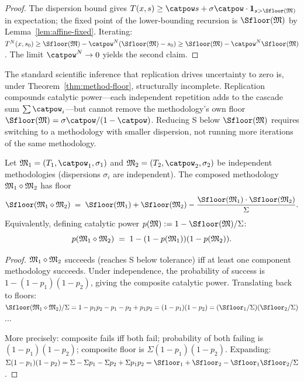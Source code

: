 \begin{proof}
The dispersion bound gives $T(x,s) \geq \catpow s + \sigma\catpow \cdot \mathbf{1}_{s > \Sfloor(\Meth)}$ in expectation; the fixed point of the lower-bounding recursion is $\Sfloor(\Meth)$ by Lemma~\ref{lem:affine-fixed}. Iterating: $T^N(x, s_0) \geq \Sfloor(\Meth) - \catpow^N(\Sfloor(\Meth) - s_0) \geq \Sfloor(\Meth) - \catpow^N \Sfloor(\Meth)$. The limit $\catpow^N \to 0$ yields the second claim.
\end{proof}

\begin{remark}\label{rem:replication}
The standard scientific inference that replication drives uncertainty to zero is, under Theorem~\ref{thm:method-floor}, structurally incomplete. Replication compounds catalytic power---each independent repetition adds to the cascade sum $\sum \catpow_i$---but cannot remove the methodology's own floor $\Sfloor(\Meth) = \sigma\catpow/(1-\catpow)$. Reducing S below $\Sfloor(\Meth)$ requires switching to a methodology with smaller dispersion, not running more iterations of the same methodology.
\end{remark}

\begin{theorem}\label{thm:catcomp}
Let $\Meth_1 = (T_1, \catpow_1, \sigma_1)$ and $\Meth_2 = (T_2, \catpow_2, \sigma_2)$ be independent methodologies (dispersions $\sigma_i$ are independent). The composed methodology $\mathfrak{M}_1 \diamond \mathfrak{M}_2$ has floor
\[
\Sfloor(\Meth_1 \diamond \Meth_2)
\;=\; \Sfloor(\Meth_1) + \Sfloor(\Meth_2)
    - \frac{\Sfloor(\Meth_1) \cdot \Sfloor(\Meth_2)}{\Sigma}.
\]
Equivalently, defining catalytic power $p(\Meth) := 1 - \Sfloor(\Meth)/\Sigma$:
\[
p(\mathfrak{M}_1 \diamond \mathfrak{M}_2) \;=\; 1 - (1 - p(\mathfrak{M}_1))(1 - p(\mathfrak{M}_2)).
\]
\end{theorem}

\begin{proof}
$\mathfrak{M}_1 \diamond \mathfrak{M}_2$ succeeds (reaches S below tolerance) iff at least one component methodology succeeds. Under independence, the probability of success is $1 - (1 - p_1)(1 - p_2)$, giving the composite catalytic power. Translating back to floors: $\Sfloor(\Meth_1 \diamond \Meth_2)/\Sigma = 1 - p_1 p_2 - p_1 - p_2 + p_1 p_2 = (1-p_1)(1-p_2) = (\Sfloor_1/\Sigma)(\Sfloor_2/\Sigma)$...

More precisely: composite fails iff both fail; probability of both failing is $(1-p_1)(1-p_2)$; composite floor is $\Sigma(1-p_1)(1-p_2)$. Expanding: $\Sigma(1-p_1)(1-p_2) = \Sigma - \Sigma p_1 - \Sigma p_2 + \Sigma p_1 p_2 = \Sfloor_1 + \Sfloor_2 - \Sfloor_1 \Sfloor_2/\Sigma$.
\end{proof}

